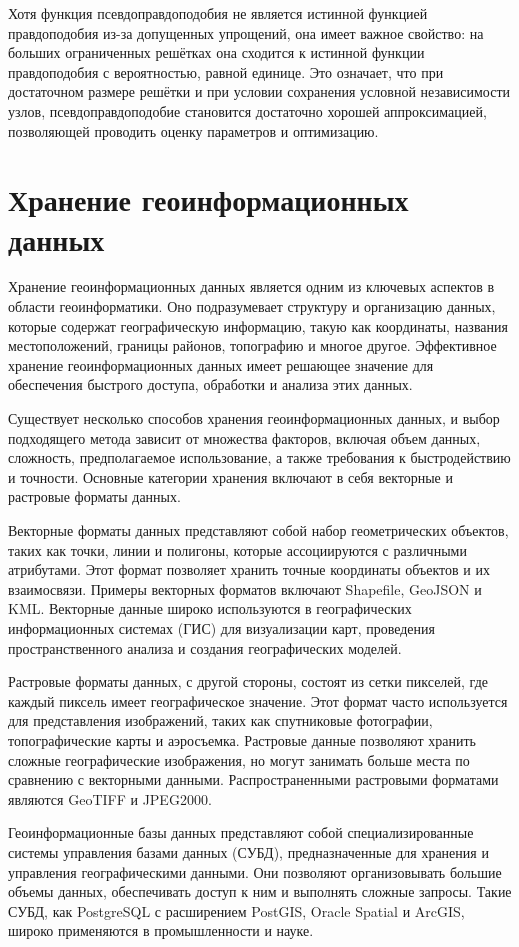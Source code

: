 Хотя функция псевдоправдоподобия не является истинной функцией правдоподобия из-за допущенных упрощений, она имеет важное свойство: на больших ограниченных решётках она сходится к истинной функции правдоподобия с вероятностью, равной единице. Это означает, что при достаточном размере решётки и при условии сохранения условной независимости узлов, псевдоправдоподобие становится достаточно хорошей аппроксимацией, позволяющей проводить оценку параметров и оптимизацию.


\section{Хранение геоинформационных данных}

Хранение геоинформационных данных является одним из ключевых аспектов в области геоинформатики. Оно подразумевает структуру и организацию данных, которые содержат географическую информацию, такую как координаты, названия местоположений, границы районов, топографию и многое другое. Эффективное хранение геоинформационных данных имеет решающее значение для обеспечения быстрого доступа, обработки и анализа этих данных.

Существует несколько способов хранения геоинформационных данных, и выбор подходящего метода зависит от множества факторов, включая объем данных, сложность, предполагаемое использование, а также требования к быстродействию и точности. Основные категории хранения включают в себя векторные и растровые форматы данных.

Векторные форматы данных представляют собой набор геометрических объектов, таких как точки, линии и полигоны, которые ассоциируются с различными атрибутами. Этот формат позволяет хранить точные координаты объектов и их взаимосвязи. Примеры векторных форматов включают Shapefile, GeoJSON и KML. Векторные данные широко используются в географических информационных системах (ГИС) для визуализации карт, проведения пространственного анализа и создания географических моделей.

Растровые форматы данных, с другой стороны, состоят из сетки пикселей, где каждый пиксель имеет географическое значение. Этот формат часто используется для представления изображений, таких как спутниковые фотографии, топографические карты и аэросъемка. Растровые данные позволяют хранить сложные географические изображения, но могут занимать больше места по сравнению с векторными данными. Распространенными растровыми форматами являются GeoTIFF и JPEG2000.

Геоинформационные базы данных представляют собой специализированные системы управления базами данных (СУБД), предназначенные для хранения и управления географическими данными. Они позволяют организовывать большие объемы данных, обеспечивать доступ к ним и выполнять сложные запросы. Такие СУБД, как PostgreSQL с расширением PostGIS, Oracle Spatial и ArcGIS, широко применяются в промышленности и науке.

